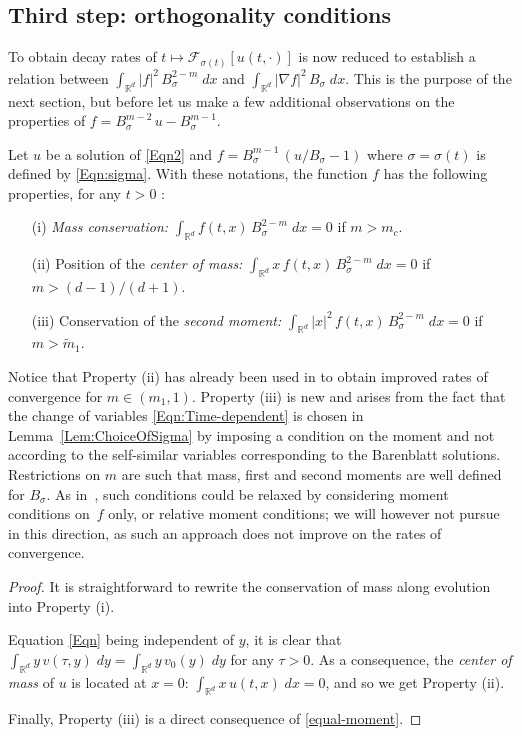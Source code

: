 \subsection*{Third step: orthogonality conditions}
To obtain decay rates of $t\mapsto\mathcal F_{\sigma(t)}[u(t,\cdot)]$ is now reduced to establish a relation between
$\int_{{{\mathbb R}}^d}|f|^2\,B_\sigma^{2-m}\;dx$ and $\int_{{{\mathbb R}}^d}|\nabla f|^2\,B_\sigma\;dx$. This is the purpose of the next section, but before let us
make a few additional observations on the properties of $f=B_\sigma^{m-2}\,u-B_\sigma^{m-1}$.
\begin{lemma}\label{Lem:OrthogonalityProperties}  Let $u$ be a solution of \eqref{Eqn2} and $f=B_\sigma^{m-1}\,(u/B_\sigma-1)$
where $\sigma=\sigma(t)$ is defined by \eqref{Eqn:sigma}. With these notations, the function $f$ has the following properties, for any $t>0$ :
\begin{enumerate}
\item[(i)] \emph{Mass conservation:} ${\int_{{{\mathbb R}}^d}{{f(t,x)\,B_\sigma^{2-m}}}\;dx}=0$ if $m>m_c$.
\item[(ii)] Position of the \emph{center of mass:} ${\int_{{{\mathbb R}}^d}{{x\,f(t,x)\,B_\sigma^{2-m}}}\;dx}=0$ if $m>(d-1)/(d+1)$.
\item[(iii)] Conservation of the \emph{second moment:} ${\int_{{{\mathbb R}}^d}{{|x|^2\,f(t,x)\,B_\sigma^{2-m}}}\;dx}=0$ if $m>\widetilde m_1$.
\end{enumerate}
\end{lemma}

Notice that Property (ii) has already been used in \cite[Theorem 7]{BDGV} to obtain improved rates of convergence for $m\in(m_1,1)$. Property
(iii) is new and arises from the fact that the change of variables \eqref{Eqn:Time-dependent} is chosen in Lemma~\ref{Lem:ChoiceOfSigma} by
imposing a condition on the moment and not according to the self-similar variables corresponding to the Barenblatt solutions. Restrictions on $m$
are such that mass, first and second moments are well defined for $B_\sigma$. As in~\cite{BDGV}, such conditions could be relaxed by considering
moment conditions on~$f$ only, or relative moment conditions; we will however not pursue in this direction, as such an approach does not improve
on the rates of convergence.

\begin{proof} It is straightforward to rewrite the conservation of mass along evolution into Property (i).

Equation \eqref{Eqn} being independent of $y$, it is clear that $\int_{{{\mathbb R}}^d}y\,v(\tau,y)\;dy=\int_{{{\mathbb R}}^d}y\,v_0(y)\;dy$ for any $\tau>0$. As a
consequence, the \emph{center of mass} of $u$ is located at $x=0$: ${\int_{{{\mathbb R}}^d}{{x\,u(t,x)}}\;dx}=0$, and so we get Property (ii).

Finally, Property (iii) is a direct consequence of \eqref{equal-moment}. \end{proof}

